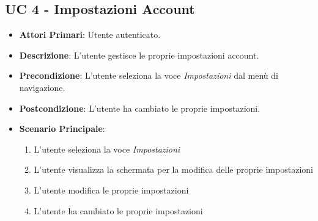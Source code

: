 	\subsection{UC 4 - Impostazioni Account}
		
		
		\begin{itemize}
			\item \textbf{Attori Primari}: Utente autenticato.
			\item \textbf{Descrizione}: L'utente gestisce le proprie impostazioni account.
			\item \textbf{Precondizione}: L'utente seleziona la voce \textit{Impostazioni} dal menù di navigazione.
			\item \textbf{Postcondizione}: L'utente ha cambiato le proprie impostazioni.
			\item \textbf{Scenario Principale}:
			\begin{enumerate}
				\item{L'utente seleziona la voce \textit{Impostazioni}}
				\item{L'utente visualizza la schermata per la modifica delle proprie impostazioni}
				\item{L'utente modifica le proprie impostazioni}
				\item{L'utente ha cambiato le proprie impostazioni}
			\end{enumerate}	
		\end{itemize}
			

